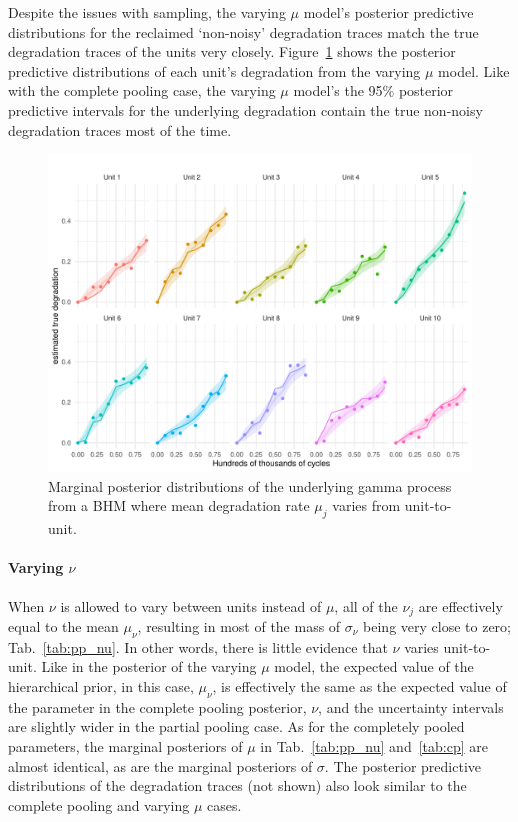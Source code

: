 Despite the issues with sampling, the varying $\mu$ model's posterior predictive distributions for the reclaimed `non-noisy' degradation traces match the true degradation traces of the units very closely. Figure~\ref{fig:pp_mu_filtered} shows the posterior predictive distributions of each unit's degradation from the varying $\mu$ model. Like with the complete pooling case, the varying $\mu$ model's the 95\% posterior predictive intervals for the underlying degradation contain the true non-noisy degradation traces most of the time.

\begin{figure}
   \centering
   \includegraphics[width=0.8\columnwidth]{./figures/ch-5/plot-pp-mu-filtered.pdf}
   \caption{Marginal posterior distributions of the underlying gamma process from a BHM where mean degradation rate $\mu_j$ varies from unit-to-unit.}
   \label{fig:pp_mu_filtered}
\end{figure}

\paragraph{Varying $\nu$} When $\nu$ is allowed to vary between units instead of $\mu$, all of the $\nu_j$ are effectively equal to the mean $\mu_\nu$, resulting in most of the mass of $\sigma_\nu$ being very close to zero; Tab.~\ref{tab:pp_nu}. In other words, there is little evidence that $\nu$ varies unit-to-unit. Like in the posterior of the varying $\mu$ model, the expected value of the hierarchical prior, in this case, $\mu_\nu$, is effectively the same as the expected value of the parameter in the complete pooling posterior, $\nu$, and the uncertainty intervals are slightly wider in the partial pooling case. As for the completely pooled parameters, the marginal posteriors of $\mu$ in Tab.~\ref{tab:pp_nu} and~\ref{tab:cp} are almost identical, as are the marginal posteriors of $\sigma$. The posterior predictive distributions of the degradation traces (not shown) also look similar to the complete pooling and varying $\mu$ cases.

